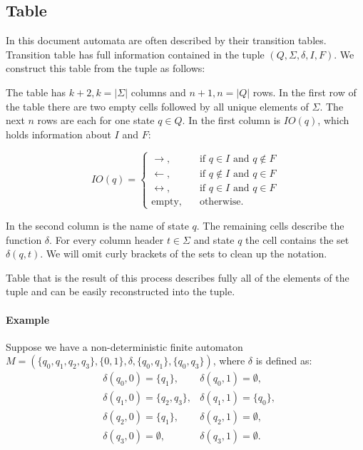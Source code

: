 \documentclass{ctuthesis}
\begin{document}
\subsection{Table}
In this document automata are often described by their transition tables. Transition table has full information contained in the tuple $(Q, \Sigma, \delta, I, F)$. We construct this table from the tuple as follows:

The table has $k+2, k = |\Sigma|$ columns and $n+1, n = |Q|$ rows. In the first row of the table there are two empty cells followed by all unique elements of $\Sigma$. The next $n$ rows are each for one state $q \in Q$. In the first column is $IO(q)$, which holds information about $I$ and $F$:

\begin{equation*}
	IO(q) = 
	\begin{cases}
		\rightarrow, & \quad \text{if } q \in I \text{ and } q \not \in F \\
		\leftarrow, & \quad \text{if } q \not \in I \text{ and } q \in F \\
		\leftrightarrow, & \quad \text{if } q \in I \text{ and } q \in F \\
		\text{empty}, & \quad \text{otherwise.}  
	\end{cases}
\end{equation*}


In the second column is the name of state $q$. The remaining cells describe the function $\delta$. For every column header $t \in \Sigma$ and state $q$ the cell contains the set $\delta(q, t)$. We will omit curly brackets of the sets to clean up the notation. 

Table that is the result of this process describes fully all of the elements of the tuple and can be easily reconstructed into the tuple.

\paragraph{Example}
Suppose we have a non-deterministic finite automaton $M = (\{q_0, q_1, q_2, q_3\}, \{0,1\}, \delta, \{q_0, q_1\}, \{q_0, q_3\})$, where $\delta$ is defined as:
\begin{align*}
	&\delta(q_0, 0) = \{q_1\}, &\delta(q_0, 1) = \emptyset, \\
	&\delta(q_1, 0) = \{q_2, q_3\}, &\delta(q_1, 1) = \{q_0\}, \\
	&\delta(q_2, 0) = \{q_1\}, &\delta(q_2, 1) = \emptyset, \\
	&\delta(q_3, 0) = \emptyset, &\delta(q_3, 1) = \emptyset. 
\end{align*}
\end{document}
